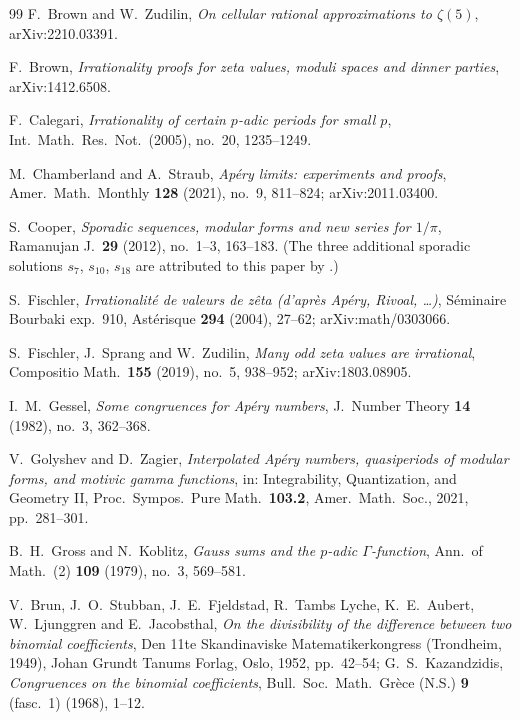 \documentclass[11pt,reqno]{article}
\theoremstyle{plain}
\theoremstyle{definition}
\theoremstyle{remark}
\numberwithin{equation}{section}
\begin{document}
\begin{thebibliography}{99}
F.~Brown and W.~Zudilin,
\emph{On cellular rational approximations to $\zeta(5)$},
arXiv:2210.03391.

F.~Brown,
\emph{Irrationality proofs for zeta values, moduli spaces and dinner parties},
arXiv:1412.6508.

F.~Calegari,
\emph{Irrationality of certain $p$-adic periods for small $p$},
Int.\ Math.\ Res.\ Not.\ (2005), no.~20, 1235--1249.

M.~Chamberland and A.~Straub,
\emph{Ap\'ery limits: experiments and proofs},
Amer.\ Math.\ Monthly \textbf{128} (2021), no.~9, 811--824;
arXiv:2011.03400.

S.~Cooper,
\emph{Sporadic sequences, modular forms and new series for $1/\pi$},
Ramanujan J.\ \textbf{29} (2012), no.~1--3, 163--183.
(The three additional sporadic solutions $s_7$, $s_{10}$, $s_{18}$ are
attributed to this paper by \cite[\S2]{MalikStraub}.)

S.~Fischler,
\emph{Irrationalit\'e de valeurs de z\^eta (d'apr\`es Ap\'ery, Rivoal, \dots)},
S\'eminaire Bourbaki exp.\ 910, Ast\'erisque \textbf{294} (2004), 27--62;
arXiv:math/0303066.

S.~Fischler, J.~Sprang and W.~Zudilin,
\emph{Many odd zeta values are irrational},
Compositio Math.\ \textbf{155} (2019), no.~5, 938--952; arXiv:1803.08905.

I.~M.~Gessel,
\emph{Some congruences for Ap\'ery numbers},
J.\ Number Theory \textbf{14} (1982), no.~3, 362--368.

V.~Golyshev and D.~Zagier,
\emph{Interpolated Ap\'ery numbers, quasiperiods of modular forms, and motivic
gamma functions},
in: Integrability, Quantization, and Geometry II,
Proc.\ Sympos.\ Pure Math.\ \textbf{103.2},
Amer.\ Math.\ Soc., 2021, pp.~281--301.

B.~H.~Gross and N.~Koblitz,
\emph{Gauss sums and the $p$-adic $\Gamma$-function},
Ann.\ of Math.\ (2) \textbf{109} (1979), no.~3, 569--581.

V.~Brun, J.~O.~Stubban, J.~E.~Fjeldstad, R.~Tambs Lyche, K.~E.~Aubert,
W.~Ljunggren and E.~Jacobsthal,
\emph{On the divisibility of the difference between two binomial coefficients},
Den 11te Skandinaviske Matematikerkongress (Trondheim, 1949),
Johan Grundt Tanums Forlag, Oslo, 1952, pp.~42--54;
G.~S.~Kazandzidis,
\emph{Congruences on the binomial coefficients},
Bull.\ Soc.\ Math.\ Gr\`ece (N.S.) \textbf{9} (fasc.~1) (1968), 1--12.


\end{thebibliography}
\end{document}

